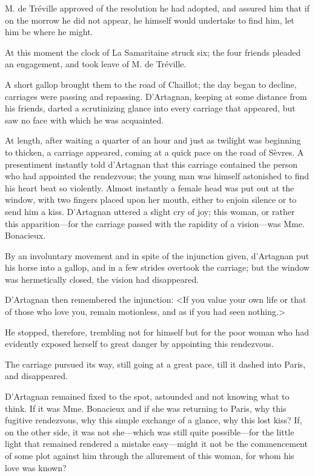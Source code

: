 M. de Tréville approved of the resolution he had adopted, and assured him that if on the morrow he did not appear, he himself would undertake to find him, let him be where he might. 

At this moment the clock of La Samaritaine struck six; the four friends pleaded an engagement, and took leave of M. de Tréville. 

A short gallop brought them to the road of Chaillot; the day began to decline, carriages were passing and repassing. D'Artagnan, keeping at some distance from his friends, darted a scrutinizing glance into every carriage that appeared, but saw no face with which he was acquainted. 

At length, after waiting a quarter of an hour and just as twilight was beginning to thicken, a carriage appeared, coming at a quick pace on the road of Sèvres. A presentiment instantly told d'Artagnan that this carriage contained the person who had appointed the rendezvous; the young man was himself astonished to find his heart beat so violently. Almost instantly a female head was put out at the window, with two fingers placed upon her mouth, either to enjoin silence or to send him a kiss. D'Artagnan uttered a slight cry of joy; this woman, or rather this apparition---for the carriage passed with the rapidity of a vision---was Mme. Bonacieux. 

By an involuntary movement and in spite of the injunction given, d'Artagnan put his horse into a gallop, and in a few strides overtook the carriage; but the window was hermetically closed, the vision had disappeared. 

D'Artagnan then remembered the injunction: <If you value your own life or that of those who love you, remain motionless, and as if you had seen nothing.> 

He stopped, therefore, trembling not for himself but for the poor woman who had evidently exposed herself to great danger by appointing this rendezvous. 

The carriage pursued its way, still going at a great pace, till it dashed into Paris, and disappeared. 

D'Artagnan remained fixed to the spot, astounded and not knowing what to think. If it was Mme. Bonacieux and if she was returning to Paris, why this fugitive rendezvous, why this simple exchange of a glance, why this lost kiss? If, on the other side, it was not she---which was still quite possible---for the little light that remained rendered a mistake easy---might it not be the commencement of some plot against him through the allurement of this woman, for whom his love was known? 

